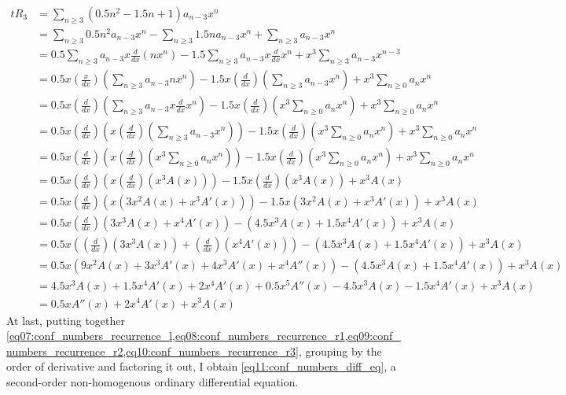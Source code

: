 \documentclass[stu, 11pt, a4paper, floatsintext]{apa7}
\begin{document}
	\begin{equation}
		\begin{split}
			\label{eq10:conf_numbers_recurrence_r3}t
			R_3 & =\sum_{n\geq 3}\left(0.5n^2-1.5n+1\right)a_{n-3}x^n \\
			& =\sum_{n\geq 3}0.5n^2a_{n-3}x^n-\sum_{n\geq 3}1.5na_{n-3}x^n+\sum_{n\geq 3}a_{n-3}x^n \\
			& =0.5\sum_{n\geq3}a_{n-3}x\frac{d}{dx}\left(nx^n\right)-1.5\sum_{n\geq3}a_{n-3}x\frac{d}{dx}x^n+x^3\sum_{n\geq3}a_{n-3}x^{n-3} \\
			& =0.5x(\frac{x}{dx})\left(\sum_{n\geq3}a_{n-3}nx^n\right)-1.5x(\frac{d}{dx})\left(\sum_{n\geq3}a_{n-3}x^n\right)+x^3\sum_{n\geq0}a_nx^n \\
			& =0.5x(\frac{d}{dx})\left(\sum_{n\geq3}a_{n-3}x\frac{d}{dx}x^n\right)-1.5x(\frac{d}{dx})\left(x^3\sum_{n\geq0}a_nx^n\right)+x^3\sum_{n\geq0}a_nx^n \\
			& =0.5x(\frac{d}{dx})\left(x(\frac{d}{dx})\left(\sum_{n\geq3}a_{n-3}x^n\right)\right)-1.5x(\frac{d}{dx})\left(x^3\sum_{n\geq0}a_nx^n\right)+x^3\sum_{n\geq0}a_nx^n \\
			& =0.5x(\frac{d}{dx})\left(x(\frac{d}{dx})\left(x^3\sum_{n\geq0}a_nx^n\right)\right)-1.5x(\frac{d}{dx})\left(x^3\sum_{n\geq0}a_nx^n\right)+x^3\sum_{n\geq0}a_nx^n \\
			& =0.5x(\frac{d}{dx})\left(x(\frac{d}{dx})\left(x^3A(x)\right)\right)-1.5x(\frac{d}{dx})\left(x^3A(x)\right)+x^3A(x) \\
			& =0.5x(\frac{d}{dx})\left(x\left(3x^2A(x)+x^3A'(x)\right)\right)-1.5x\left(3x^2A(x)+x^3A'(x)\right)+x^3A(x) \\
			& =0.5x(\frac{d}{dx})\left(3x^3A(x)+x^4A'(x)\right)-\left(4.5x^3A(x)+1.5x^4A'(x)\right)+x^3A(x) \\
			& =0.5x\left((\frac{d}{dx})\left(3x^3A(x)\right)+(\frac{d}{dx})\left(x^4A'(x)\right)\right)-\left(4.5x^3A(x)+1.5x^4A'(x)\right)+x^3A(x) \\
			& =0.5x\left(9x^2A(x)+3x^3A'(x)+4x^3A'(x)+x^4A''(x)\right)-\left(4.5x^3A(x)+1.5x^4A'(x)\right)+x^3A(x) \\
			& =4.5x^3A(x)+1.5x^4A'(x)+2x^4A'(x)+0.5x^5A''(x)-4.5x^3A(x)-1.5x^4A'(x)+x^3A(x) \\
			& =0.5xA''(x)+2x^4A'(x)+x^3A(x)
		\end{split}
	\end{equation}
	At last, putting together \cref{eq07:conf_numbers_recurrence_l,eq08:conf_numbers_recurrence_r1,eq09:conf_numbers_recurrence_r2,eq10:conf_numbers_recurrence_r3}, grouping by the order of  derivative and factoring it out, I obtain \cref{eq11:conf_numbers_diff_eq}, a second-order non-homogenous ordinary differential equation.
\end{document}

